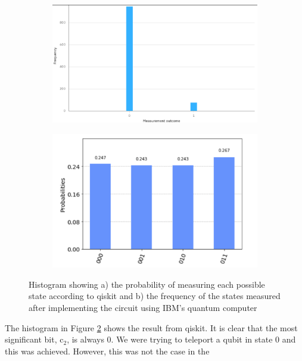 \begin{figure}[h]
    \centering
    \begin{subfigure}[h]{0.49\textwidth}
        \centering
        \includegraphics[width=\textwidth]{lab3/images/ibmTeleport.png}
        \caption{}
        \label{fig:ibmHistogramTele}
    \end{subfigure}
    \hfill
    \begin{subfigure}[h]{0.49\textwidth}
        \centering
        \includegraphics[width=\textwidth]{lab3/images/qiskitHist.png}
        \caption{}
        \label{fig:qiskitHistogramTele}
    \end{subfigure}
    \caption{Histogram showing a) the probability of measuring each possible state according to qiskit and b) the frequency of the states measured after implementing the circuit using IBM's quantum computer} 
    \label{fig:teleHist}
\end{figure}

The histogram in Figure \ref{fig:qiskitHistogramTele} shows the result from qiskit. It is clear that the most significant bit, c$_2$, is always 0. We were trying to teleport a qubit in state 0 and this was achieved. However, this was not the case in the 

